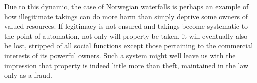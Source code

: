 Due to this dynamic, the case of Norwegian waterfalls is perhaps an example of how illegitimate takings can do more harm than simply deprive some owners of valued resources. If legitimacy is not ensured and takings become systematic to the point of automation, not only will property be taken, it will eventually also be lost, stripped of all social functions except those pertaining to the commercial interests of its powerful owners. Such a system might well leave us with the impression that property is indeed little more than theft, maintained in the law only as a fraud.


